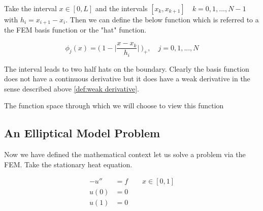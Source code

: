 \documentclass{uonmathreport}
\theoremstyle{definition}
\theoremstyle{problem}
\theoremstyle{theorem}
\begin{document}
Take the interval $x \in [0,L]$ and the intervals $[x_k, x_{k+1}] \quad k=0, 1, ... , N-1$ with $h_i = x_{i+1}-x_i$. Then we can define the below function which is referred to a the FEM basis function or the "hat" function.

\begin{equation}
\phi_j(x) =  \Big(\:1 - \Big|\frac{x-x_k}{h_i}\Big| \: \Big)_+ , \quad j = 0,1,..., N
\end{equation}

The interval leads to two half hats on the boundary. Clearly the basis function does not have a continuous derivative but it does have a weak derivative in the sense described above \ref{def:weak derivative}.

The function space through which we will choose to view this function 

\begin{center}
\end{center}



\subsection{An Elliptical Model Problem} \label{subsec:Weak Formulation1}

Now we have defined the mathematical context let us solve a problem via the FEM. Take the stationary heat equation.

\begin{subequations} 
\label{eq:Steady Diffusion1} 
\begin{align}
-u'' &= f		\quad \quad  x \in [0, 1] \\  	
u(0) &= 0 \\
u(1) &= 0
\end{align}
\end{subequations}
\end{document}
